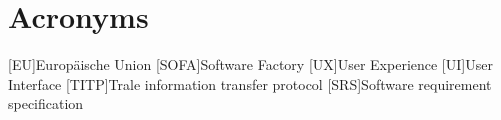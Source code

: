 \chapter{Acronyms}\label{ch:acronyms}
\begin{acronym}
    [EU]{Europäische Union}
    [SOFA]{Software Factory}
    [UX]{User Experience}
    [UI]{User Interface}
    [TITP]{Trale information transfer protocol}
    [SRS]{Software requirement specification}
\end{acronym}
